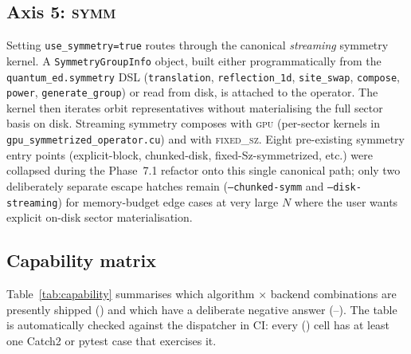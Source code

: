 \documentclass[submission, PhysCodeb]{SciPost}
\begin{document}
\subsection{Axis 5: \textsc{symm}}
\label{sec:axes-symm}
Setting \texttt{use\_symmetry=true} routes through the canonical
\emph{streaming} symmetry kernel. A \texttt{SymmetryGroupInfo}
object, built either programmatically from the
\texttt{quantum\_ed.symmetry} DSL (\texttt{translation},
\texttt{reflection\_1d}, \texttt{site\_swap}, \texttt{compose},
\texttt{power}, \texttt{generate\_group}) or read from disk, is
attached to the operator. The kernel then iterates orbit
representatives without materialising the full sector basis on disk.
Streaming symmetry composes with \textsc{gpu} (per-sector kernels in
\texttt{gpu\_symmetrized\_operator.cu}) and with \textsc{fixed\_sz}.
Eight pre-existing symmetry entry points (explicit-block,
chunked-disk, fixed-Sz-symmetrized, etc.) were collapsed during the
Phase~7.1 refactor onto this single canonical path; only two
deliberately separate escape hatches remain (\texttt{--chunked-symm}
and \texttt{--disk-streaming}) for memory-budget edge cases at very
large $N$ where the user wants explicit on-disk sector
materialisation.

\subsection{Capability matrix}
\label{sec:axes-matrix}
Table~\ref{tab:capability} summarises which algorithm $\times$
backend combinations are presently shipped (\checkmark) and which
have a deliberate negative answer (--). The table is automatically
checked against the dispatcher in CI: every (\checkmark) cell has at
least one Catch2 or pytest case that exercises it.
\end{document}
